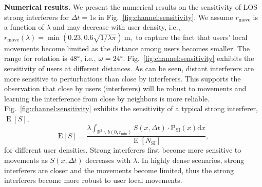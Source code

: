 \documentclass[10pt, conference, letterpaper]{IEEEtran}
\DeclareMathOperator*{\E}{\mathrm{E}}
\begin{document}


\textbf{Numerical results.}
We present the numerical results on the sensitivity of LOS strong interferers for $\Delta t= 1$s in Fig.~\ref{fig:channel:sensitivity}. 
We assume $r_{\mathrm{move}}$ is a function of $\lambda$ and may decrease with user density, i.e., 
$r_{\mathrm{move}}(\lambda) = \min(0.23, 0.6 \sqrt{1/\lambda\pi}) \mathrm{~m},$
to capture the fact that users' local movements become limited as the distance among users becomes smaller. 
The range for rotation is $48\degree$, i.e., $\omega = 24\degree$. 
Fig.~\ref{fig:channel:sensitivity} exhibits the sensitivity of users at different distances. 
As can be seen, distant interferers are more sensitive to perturbations than close by interferers. 
This supports the observation that close by users (interferers) will be robust to movements and learning the interference from close by neighbors is more reliable. 
Fig.~\ref{fig:channel:sensitivity} exhibits the sensitivity of a typical strong interferer, $\E[S]$,
\begin{equation*}
\mathrm{E}[S] = \frac{\lambda\int_{\mathbb{R}^2\backslash b(0, r_{\min})}S(x,\Delta t)\cdot \mathrm{P_{SI}}(x) \mathrm{d}x}{\E[N_{\mathrm{SI}}]},
\end{equation*}
for different user densities.
Strong interferers first become more sensitive to movements as $S(x, \Delta t)$ decreases with $\lambda$. 
In highly dense scenarios, strong interferers are closer and the movements become limited, thus the strong interferers become more robust to user local movements.
\end{document}
